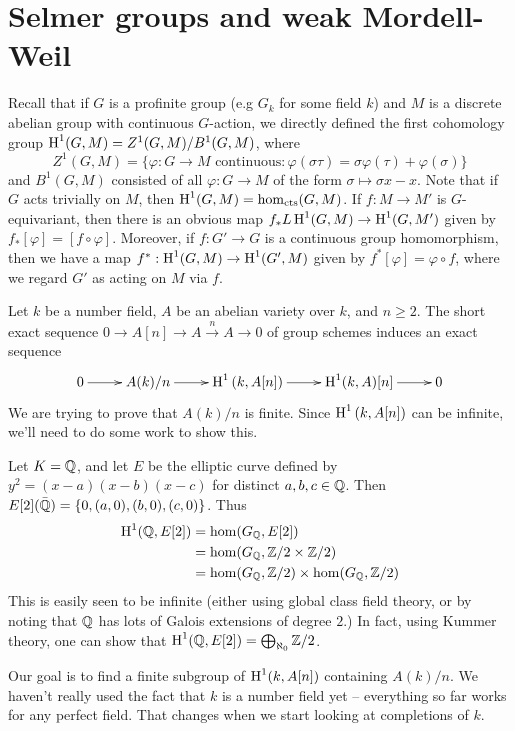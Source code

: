 \documentclass{article}
\begin{document}
\section{Selmer groups and weak Mordell-Weil}

Recall that if $G$ is a profinite group (e.g $G_k$ for some field $k$) and $M$ 
is a discrete abelian group with continuous $G$-action, we directly defined the 
first cohomology group $\operatorname{H}^1(G,M) = Z^1(G,M) / B^1(G,M)$, where 
\[
  Z^1(G,M) = \{\varphi:G\to M\text{ continuous}: \varphi(\sigma\tau) = \sigma \varphi(\tau)+\varphi(\sigma)\}
\]
and $B^1(G,M)$ consisted of all $\varphi:G\to M$ of the form 
$\sigma\mapsto \sigma x-x$. Note that if $G$ acts trivially on $M$, then 
$\operatorname{H}^1(G,M) = \hom_\text{cts}(G,M)$. If $f:M\to M'$ is $G$-equivariant, then 
there is an obvious map $f_*L\operatorname{H}^1(G,M)\to \operatorname{H}^1(G,M')$ given by 
$f_*[\varphi] = [f\circ \varphi]$. Moreover, if $f:G'\to G$ is a continuous 
group homomorphism, then we have a map $f^*:\operatorname{H}^1(G,M) \to \operatorname{H}^1(G',M)$ given 
by $f^*[\varphi] = \varphi\circ f$, where we regard $G'$ as acting on $M$ via 
$f$. 

Let $k$ be a number field, $A$ be an abelian variety over $k$, and 
$n\geqslant 2$. The short exact sequence $0\to A[n]\to A\xrightarrow n A \to 0$ 
of group schemes induces an exact sequence 
\[\xymatrix{
  0 \ar[r]  
    & A(k)/n \ar[r] 
    & \h^1\left(k,A[n]\right) \ar[r] 
    & \h^1(k,A)[n] \ar[r] 
    & 0
}\]
We are trying to prove that $A(k)/n$ is finite. Since $\operatorname{H}^1\left(k,A[n]\right)$ 
can be infinite, we'll need to do some work to show this. 

\begin{example}
Let $K=\mathbb{Q}$, and let $E$ be the elliptic curve defined by 
$y^2=(x-a)(x-b)(x-c)$ for distinct $a,b,c\in \mathbb{Q}$. Then 
$E[2](\bar{\mathbb{Q}}) = \{0,(a,0),(b,0),(c,0)\}$. Thus 
\begin{align*}
  \operatorname{H}^1(\mathbb{Q},E[2]) &= \hom(G_{\mathbb{Q}},E[2]) \\
    &= \hom(G_{\mathbb{Q}},\mathbb{Z}/2\times \mathbb{Z}/2) \\
    &= \hom(G_{\mathbb{Q}},\mathbb{Z}/2) \times \hom(G_{\mathbb{Q}},\mathbb{Z}/2)
\end{align*}
This is easily seen to be infinite (either using global class field theory, or 
by noting that $\mathbb{Q}$ has lots of Galois extensions of degree $2$.) In fact, 
using Kummer theory, one can show that 
$\operatorname{H}^1(\mathbb{Q},E[2]) = \bigoplus_{\aleph_0} \mathbb{Z}/2$. 
\end{example}

Our goal is to find a finite subgroup of $\operatorname{H}^1(k,A[n])$ containing $A(k)/n$. 
We haven't really used the fact that $k$ is a number field yet -- everything so 
far works for any perfect field. That changes when we start looking at 
completions of $k$. 
\end{document}
